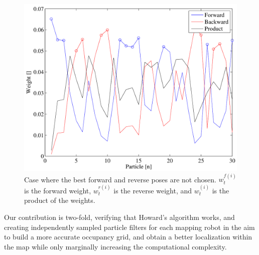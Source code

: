 \begin{figure}[h]
\centering
\includegraphics[width=\columnwidth]{../FinalFigures/Depletion}
\caption{Case where the best forward and reverse poses are not chosen. $w^{f(i)}_{t}$ is the forward weight, $w^{r(i)}_{t}$ is the reverse weight, and $w^{(i)}_t$ is the product of the weights.}
\label{fig:deplete}
\end{figure}

Our contribution is two-fold, verifying that Howard's algorithm works, and creating independently sampled particle filters for each mapping robot in the aim to build a more accurate occupancy grid, and obtain a better localization within the map while only marginally increasing the computational complexity.



